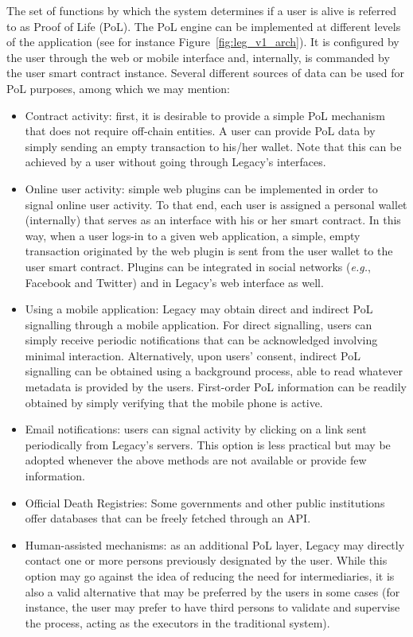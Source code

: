 The set of functions by which the system determines if a user is alive is referred to as Proof of Life (PoL). The PoL engine can be implemented at different levels of the application (see for instance Figure~\ref{fig:leg_v1_arch}). It is configured by the user through the web or mobile interface and, internally, is commanded by the user smart contract instance. Several different sources of data can be used for PoL purposes, among which we may mention:
\begin{itemize}
	\item Contract activity: first, it is desirable to provide a simple PoL mechanism that does not require off-chain entities. A user can provide PoL data by simply sending an empty transaction to his/her wallet. Note that this can be achieved by a user without going through Legacy's interfaces.

	\item Online user activity: simple web plugins can be implemented in order to signal online user activity. To that end, each user is assigned a personal wallet (internally) that serves as an interface with his or her smart contract. In this way, when a user logs-in to a given web application, a simple, empty transaction originated by the web plugin is sent from the user wallet to the user smart contract. Plugins can be integrated in social networks (\textit{e.g.}, Facebook and Twitter) and in Legacy's web interface as well.

	\item Using a mobile application: Legacy may obtain direct and indirect PoL signalling through a mobile application. For direct signalling, users can simply receive periodic notifications that can be acknowledged involving minimal interaction. Alternatively, upon users' consent, indirect PoL signalling can be obtained using a background process, able to read whatever metadata is provided by the users. First-order PoL information can be readily obtained by simply verifying that the mobile phone is active.

	\item Email notifications: users can signal activity by clicking on a link sent periodically from Legacy’s servers. This option is less practical but may be adopted whenever the above methods are not available or provide few information.

	\item Official Death Registries: Some governments and other public institutions offer databases that can be freely fetched through an API.

	\item Human-assisted mechanisms: as an additional PoL layer, Legacy may directly contact one or more persons previously designated by the user. 	
	While this option may go against the idea of reducing the need for intermediaries, it is also a valid alternative that may be preferred by the users in some cases (for instance, the user may prefer to have third persons to validate and supervise the process, acting as the executors in the traditional system).
\end{itemize}

